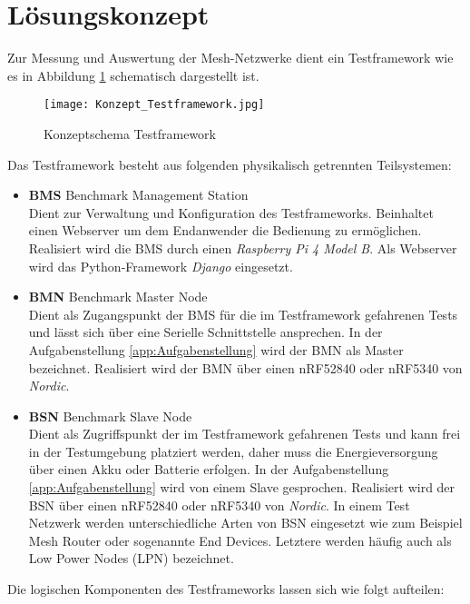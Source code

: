\clearpage
\section{Lösungskonzept}\label{sec:Loesungskonzept}
Zur Messung und Auswertung der Mesh-Netzwerke dient ein Testframework wie es in Abbildung \ref{fig:KonzeptschemaTestframework} schematisch dargestellt ist.

\begin{figure}[H]
	\centering
	\texttt{[image: Konzept\_Testframework.jpg]}
	\caption{Konzeptschema Testframework}\label{fig:KonzeptschemaTestframework}
\end{figure}


Das Testframework besteht aus folgenden physikalisch getrennten Teilsystemen:

\begin{itemize}
	\item \textbf{BMS} Benchmark Management Station \\ 
	Dient zur Verwaltung und Konfiguration des Testframeworks. Beinhaltet einen Webserver um dem Endanwender die Bedienung zu ermöglichen. Realisiert wird die BMS durch einen \textit{Raspberry Pi 4 Model B}. Als Webserver wird das Python-Framework \textit{Django} eingesetzt. 
	\item \textbf{BMN} Benchmark Master Node \\ 
	Dient als Zugangspunkt der BMS für die im Testframework gefahrenen Tests und lässt sich über eine Serielle Schnittstelle ansprechen. In der Aufgabenstellung \ref{app:Aufgabenstellung} wird der BMN als Master bezeichnet. Realisiert wird der BMN über einen nRF52840 oder nRF5340 von \textit{Nordic}. 
	\item \textbf{BSN} Benchmark Slave Node \\ 
	Dient als Zugriffspunkt der im Testframework gefahrenen Tests und kann frei in der Testumgebung platziert werden, daher muss die Energieversorgung über einen Akku oder Batterie erfolgen. In der Aufgabenstellung  \ref{app:Aufgabenstellung} wird von einem Slave gesprochen. Realisiert wird der BSN über einen nRF52840 oder nRF5340 von \textit{Nordic}. In einem Test Netzwerk werden unterschiedliche Arten von BSN eingesetzt wie zum Beispiel Mesh Router oder sogenannte End Devices. Letztere werden häufig auch als Low Power Nodes (LPN) bezeichnet.
\end{itemize}

Die logischen Komponenten des Testframeworks lassen sich wie folgt aufteilen:

